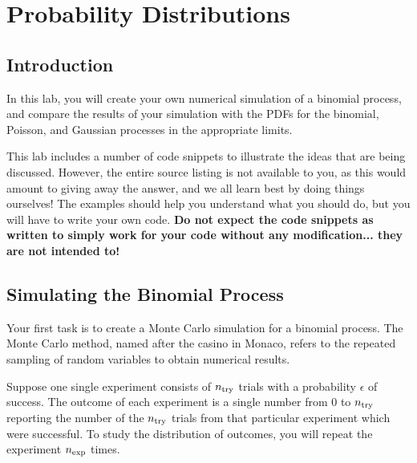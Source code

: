 \chapter{Probability Distributions}

\section{Introduction}

In this lab, you will create your own numerical simulation of a binomial
process, and compare the results of your simulation with the PDFs for
the binomial, Poisson, and Gaussian processes in the appropriate
limits.  

This lab includes a number of code snippets to illustrate the ideas
that are being discussed.  However, the entire source listing is not
available to you, as this would amount to giving away the answer, and
we all learn best by doing things ourselves!  The examples should
help you understand what you should do, but you will have to write
your own code.  {\bf Do not expect the code snippets as written to
  simply work for your code without any modification... they are not
  intended to!}

\section{Simulating the Binomial Process}

Your first task is to create a Monte Carlo simulation for a binomial
process.  The Monte Carlo method, named after the casino in Monaco, refers
to the repeated sampling of random variables to obtain numerical results.

Suppose one single experiment consists of $n_{\rm try}$ trials with a
probability $\epsilon$ of success.  The outcome of each experiment is
a single number from 0 to $n_{\rm try}$ reporting the number of the
$n_{\rm try}$ trials from that particular experiment which were
successful.  To study the distribution of outcomes, you will repeat the
experiment $n_{\rm exp}$ times.

